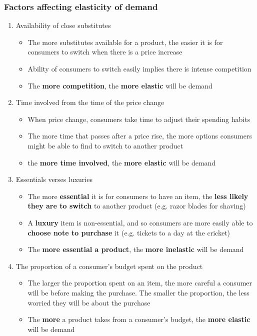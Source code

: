 \subsubsection{Factors affecting elasticity of demand}
\begin{enumerate}
	\item Availability of close substitutes
	\begin{itemize}
		\item The more substitutes available for a product, the easier it is for consumers to switch when there is a price increase
		\item Ability of consumers to switch easily implies there is intense competition
		\item The \textbf{more competition}, the \textbf{more elastic} will be demand
	\end{itemize}
	\item Time involved from the time of the price change
	\begin{itemize}
		\item When price change, consumers take time to adjust their spending habits
		\item The more time that passes after a price rise, the more options consumers might be able to find to switch to another product
		\item the \textbf{more time involved}, the \textbf{more elastic} will be demand
	\end{itemize}
	\item Essentials verses luxuries
	\begin{itemize}
		\item The more \textbf{essential} it is for consumers to have an item, the \textbf{less likely they are to switch} to another product (e.g. razor blades for shaving)
		\item A \textbf{luxury} item is non-essential, and so consumers are more easily able to \textbf{choose note to purchase} it (e.g. tickets to a day at the cricket)
		\item The \textbf{more essential a product}, the \textbf{more inelastic} will be demand
	\end{itemize}
	\item The proportion of a consumer's budget spent on the product
	\begin{itemize}
		\item The larger the proportion spent on an item, the more careful a consumer will be before making the purchase. The smaller the proportion, the less worried they will be about the purchase
		\item The \textbf{more} a product takes from a consumer's budget, the \textbf{more elastic} will be demand
	\end{itemize}
\end{enumerate}

